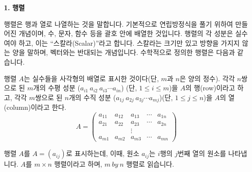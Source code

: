 

\begin{flushleft}
    {\setmainfont[Path=FONT/]{KOPUBWORLD_DOTUM_PRO_BOLD.OTF} {\textcolor{header}{{\huge\textbf{1.}}}}}
    { {\textcolor{header}{{\huge\textbf{행렬}}}}}
\end{flushleft}

\begin{flushleft}
    행렬은 행과 열로 나열하는 것을 말합니다. 기본적으로 연립방정식을 풀기 위하여 만들어진 개념이며, 수, 문자, 함수 등을 괄호 안에 배열한 것입니다. 행렬의 각 성분은 실수여야 하고, 이는 “스칼라(Scalar)”라고 합니다. 스칼라는 크기만 있고 방향을 가지지 않는 양을 말하며, 벡터와는 반대되는 개념입니다. 수학적으로 정의한 행렬은 다음과 같습니다. 
\end{flushleft}

\begin{tcolorbox}[colback = white, colframe = Definition, title = \textmd{정의: 행렬}]
    행렬 $A$는 실수들을 사각형의 배열로 표시한 것이다(단, $m$과 $n$은 양의 정수). 각각 $n$쌍으로 된 $m$개의 수평 성분 ($a_{i1} \ a_{i2} \ a_{i3} \cdots  a_{in} $) (단, $1 \leq i \leq m $)을 $A$의 행(row)이라고 하고, 각각 $m$쌍으로 된 $n$개의 수직 성분 ($a_{1j} \ a_{2j} \ a_{3j} \cdots  a_{mj} $)(단, $1 \leq j \leq n$)을 $A$의 열(column)이라고 한다.
    $$ A = \begin{pmatrix} a_{11} & a_{12} & a_{13} & \cdots & a_{1n} \\  
a_{21} & a_{22} & a_{23} & \cdots  & a_{2n}  \\ && \vdots &&  \\
a_{m1} & a_{m2} & a_{m3} & \cdots & a_{mn}\end{pmatrix}  $$
\end{tcolorbox}

\begin{flushleft}
행렬 $A$를 $A = (a_{ij})$로 표시하는데, 이때, 원소 $a_{ij}$는 $i$행의 $j$번째 열의 원소를 나타냅니다. $A$를 $m \times n$ 행렬이라고 하며, $m \ by \ n$ 행렬로 읽습니다.
\end{flushleft}
